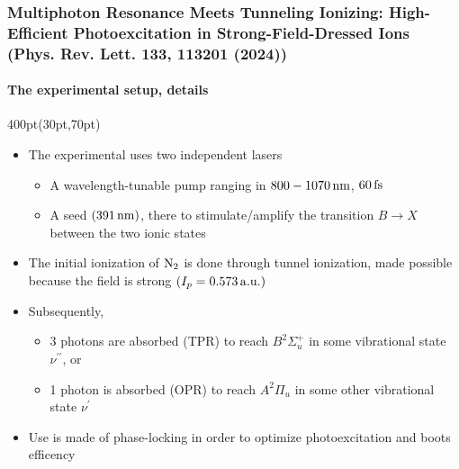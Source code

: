 \begin{frame}
\frametitle{
Multiphoton Resonance Meets Tunneling Ionizing:
High-Efficient Photoexcitation in Strong-Field-Dressed Ions\\
\small (Phys. Rev. Lett. \textbf{133}, 113201 (2024)) 
}
\framesubtitle{The experimental setup, details}


\footnotesize
\begin{textblock*}{400pt}(30pt,70pt)
\begin{itemize}
\item The experimental uses two independent lasers
\begin{itemize}
\footnotesize
\item[$\bullet$] A wavelength-tunable pump ranging in $800-1070\,\rm nm$, 
$60\, \rm fs$
\item[$\bullet$] A seed  $(391\,{\rm nm})$, 
there to stimulate/amplify the transition 
${ B} \longrightarrow {X}$ between the two ionic states
\end{itemize}
\item The initial ionization of ${\rm N}_2$ is done through tunnel ionization, 
made possible because the field is strong $(I_p = 0.573\,{\rm a.u.})$
\item Subsequently, 
\begin{itemize}
\footnotesize
\item[$\bullet$] 3 photons are absorbed (TPR) to reach ${B}^2\Sigma_u^+$ 
in some vibrational state $\nu^{\prime\prime}$, or
\item[$\bullet$] 1 photon is absorbed (OPR) to reach ${A}^2\Pi_u$ 
in some other vibrational state $\nu^{\prime}$
\end{itemize}
\vspace{10pt}
\item Use is made of phase-locking in order to optimize photoexcitation and 
boots efficency
\end{itemize}
\end{textblock*}
 
\end{frame}





